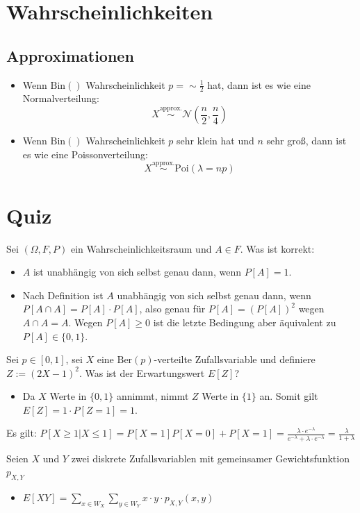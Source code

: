 \documentclass{article}
\begin{document}
\section{Wahrscheinlichkeiten}

\subsection{Approximationen}
\begin{itemize}
    \item Wenn $\text{Bin}()$ Wahrscheinlichkeit $p = \sim \frac{1}{2}$ hat, dann ist es wie eine Normalverteilung:
    $$X \stackrel{\text{approx.}}{\sim} \mathcal{N}\left(\frac{n}{2}, \frac{n}{4}\right)$$
    \item Wenn $\text{Bin}()$ Wahrscheinlichkeit $p$ sehr klein hat und $n$ sehr groß, dann ist es wie eine Poissonverteilung:
    $$X \stackrel{\text{approx.}}{\sim} \text{Poi}(\lambda = np)$$
\end{itemize}

\section{Quiz}
Sei $(\Omega, F, P)$ ein Wahrscheinlichkeitsraum und $A \in F$. Was ist korrekt:
\begin{itemize}
    \item $A$ ist unabhängig von sich selbst genau dann, wenn $P[A] = 1$.
    \item Nach Definition ist $A$ unabhängig von sich selbst genau dann, wenn $P[A \cap A] = P[A] \cdot P[A]$, also genau für $P[A] = (P[A])^2$ wegen $A \cap A = A$. Wegen $P[A] \geq 0$ ist die letzte Bedingung aber äquivalent zu $P[A] \in \{0, 1\}$.
\end{itemize}

Sei $p \in [0, 1]$, sei $X$ eine $\text{Ber}(p)$-verteilte Zufallsvariable und definiere $Z := (2X - 1)^2$. Was ist der Erwartungswert $E[Z]$?
\begin{itemize}
    \item Da $X$ Werte in $\{0, 1\}$ annimmt, nimmt $Z$ Werte in $\{1\}$ an. Somit gilt $E[Z] = 1 \cdot P[Z = 1] = 1$.
\end{itemize}

Es gilt: $P[X \geq 1|X \leq 1] = P[X = 1] P[X = 0] + P[X = 1] = \frac{\lambda \cdot e^{-\lambda}}{e^{-\lambda} + \lambda \cdot e^{-\lambda}} = \frac{\lambda}{1 + \lambda}$

Seien $X$ und $Y$ zwei diskrete Zufallsvariablen mit gemeinsamer Gewichtsfunktion $p_{X,Y}$
\begin{itemize}
    \item $E[XY] = \sum_{x \in W_X} \sum_{y \in W_Y} x \cdot y \cdot p_{X, Y}(x, y)$
\end{itemize}
\end{document}
